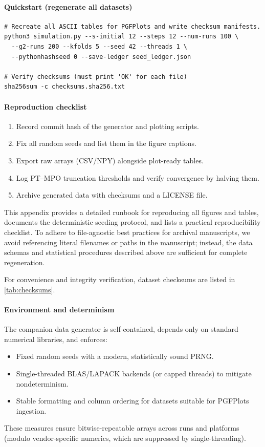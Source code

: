 \documentclass[a4paper,11pt]{article}
\theoremstyle{plain}
\theoremstyle{definition}
\theoremstyle{remark}
\begin{document}
\paragraph{Quickstart (regenerate all datasets)}
\begin{verbatim}
# Recreate all ASCII tables for PGFPlots and write checksum manifests.
python3 simulation.py --s-initial 12 --steps 12 --num-runs 100 \
  --g2-runs 200 --kfolds 5 --seed 42 --threads 1 \
  --pythonhashseed 0 --save-ledger seed_ledger.json

# Verify checksums (must print 'OK' for each file)
sha256sum -c checksums.sha256.txt
\end{verbatim}

\paragraph{Reproduction checklist}
\begin{enumerate}[label=(\alph*)]
  \item Record commit hash of the generator and plotting scripts.
  \item Fix all random seeds and list them in the figure captions.
  \item Export raw arrays (CSV/NPY) alongside plot-ready tables.
  \item Log PT--MPO truncation thresholds and verify convergence by halving them.
  \item Archive generated data with checksums and a LICENSE file.
\end{enumerate}

This appendix provides a detailed runbook for reproducing all figures and tables, documents the deterministic seeding protocol, and lists a practical reproducibility checklist. To adhere to file-agnostic best practices for archival manuscripts, we avoid referencing literal filenames or paths in the manuscript; instead, the data schemas and statistical procedures described above are sufficient for complete regeneration.

For convenience and integrity verification, dataset checksums are listed in \cref{tab:checksums}.

\paragraph{Environment and determinism}
The companion data generator is self-contained, depends only on standard numerical libraries, and enforces:
\begin{itemize}
  \item Fixed random seeds with a modern, statistically sound PRNG.
  \item Single-threaded BLAS/LAPACK backends (or capped threads) to mitigate nondeterminism.
  \item Stable formatting and column ordering for datasets suitable for PGFPlots ingestion.
\end{itemize}
These measures ensure bitwise-repeatable arrays across runs and platforms (modulo vendor-specific numerics, which are suppressed by single-threading).
\end{document}
